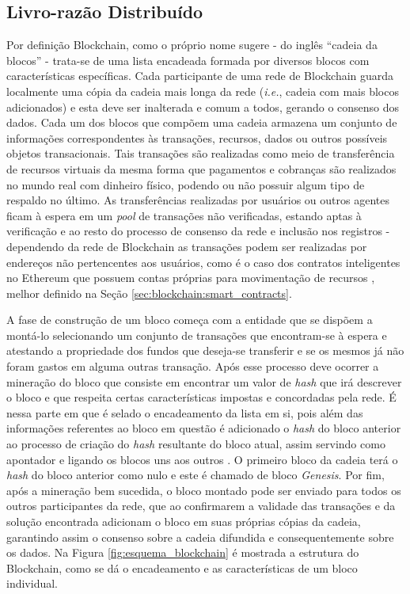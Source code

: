 \subsection{Livro-razão Distribuído}
\label{subsec:blockchain:specs}
Por definição Blockchain, como o próprio nome sugere - do inglês ``cadeia da blocos'' - trata-se de uma lista encadeada formada por diversos blocos com características específicas. Cada participante de uma rede de Blockchain guarda localmente uma cópia da cadeia mais longa da rede (\textit{i.e.}, cadeia com mais blocos adicionados) e esta deve ser inalterada e comum a todos, gerando o consenso dos dados.
%
Cada um dos blocos que compõem uma cadeia armazena um conjunto de informações correspondentes às transações, recursos, dados ou outros possíveis objetos transacionais.
%
Tais transações são realizadas como meio de transferência de recursos virtuais da mesma forma que pagamentos e cobranças são realizados no mundo real com dinheiro físico, podendo ou não possuir algum tipo de respaldo no último.
%
As transferências realizadas por usuários ou outros agentes ficam à espera em um \textit{pool} de transações não verificadas, estando aptas à verificação e ao resto do processo de consenso da rede e inclusão nos registros
%
- dependendo da rede de Blockchain as transações podem ser realizadas por endereços não pertencentes aos usuários, como é o caso dos contratos inteligentes no Ethereum que possuem contas próprias para movimentação de recursos \cite{blockchain:ethereum}, melhor definido na Seção \ref{sec:blockchain:smart_contracts}.
%

%
A fase de construção de um bloco começa com a entidade que se dispõem a montá-lo selecionando um conjunto de transações que encontram-se à espera e atestando a propriedade dos fundos que deseja-se transferir e se os mesmos já não foram gastos em alguma outras transação. Após esse processo deve ocorrer a mineração do bloco que consiste em encontrar um valor de \textit{hash} que irá descrever o bloco e que respeita certas características impostas e concordadas pela rede. É nessa parte em que é selado o encadeamento da lista em si, pois além das informações referentes ao bloco em questão é adicionado o \textit{hash} do bloco anterior ao processo de criação do \textit{hash} resultante do bloco atual, assim servindo como apontador e ligando os blocos uns aos outros \cite{blockchain:capitulo5}. O primeiro bloco da cadeia terá o \textit{hash} do bloco anterior como nulo e este é chamado de bloco \textit{Genesis}. Por fim, após a mineração bem sucedida, o bloco montado pode ser enviado para todos os outros participantes da rede, que ao confirmarem a validade das transações e da solução encontrada adicionam o bloco em suas próprias cópias da cadeia, garantindo assim o consenso sobre a cadeia difundida e consequentemente sobre os dados. Na Figura \ref{fig:esquema_blockchain} é mostrada a estrutura do Blockchain, como se dá o encadeamento e as características de um bloco individual. 


